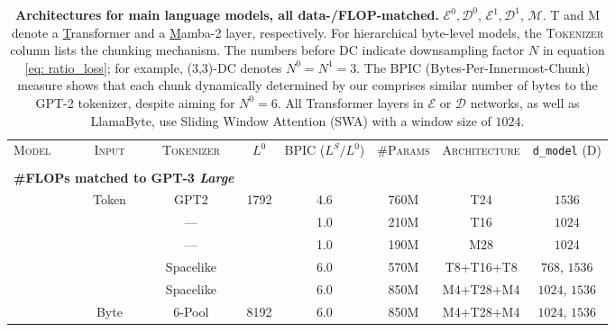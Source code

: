 \begin{table}[t!]
\caption{
\textbf{Architectures for main language models, all data-/FLOP-matched.} \colorbox{EncDec0}{$\mathcal{E}^0,\mathcal{D}^0$}, \colorbox{EncDec1}{$\mathcal{E}^1,\mathcal{D}^1$}, \colorbox{Main}{$\mathcal{M}$}.
T and M denote a \underline{T}ransformer and a \underline{M}amba-2 layer, respectively.
For hierarchical byte-level models, the \textsc{Tokenizer} column lists the chunking mechanism.
The numbers before DC indicate downsampling factor $N$ in equation \eqref{eq: ratio_loss}; for example, (3,3)-DC denotes $N^0=N^1=3$.
The BPIC (Bytes-Per-Innermost-Chunk) measure shows that each chunk dynamically determined by our \onestage{} comprises similar number of bytes to the GPT-2 tokenizer, despite aiming for $N^0=6$.
All Transformer layers in $\mathcal{E}$ or $\mathcal{D}$ networks, as well as LlamaByte, use Sliding Window Attention (SWA) with a window size of $1024$.
}
\centering
\small
\resizebox{\linewidth}{!}
{ 
\begin{tabular}{lccccccc} 
\toprule
\multirow{2}{*}{\textsc{Model}} & \multirow{2}{*}{\textsc{Input}} & \multirow{2}{*}{\textsc{Tokenizer}} & \multirow{2}{*}{$L^0$} & \multirowcell{2}{\textsc{BPIC}\\($L^S / L^0$)} & \multirow{2}{*}{\textsc{\#Params}} & \multirow{2}{*}{\textsc{Architecture}} & \multirow{2}{*}{\texttt{d\_model} (D)}\\
\\
\midrule
\multicolumn{3}{l}{\quad \textbf{\#FLOPs matched to GPT-3 \textit{Large}}}\\
\cellcolor{Gray7!20}{Transformer} & {Token} & {GPT2} & {1792} & 4.6 & 760M & \colorbox{Main}{T24} & \colorbox{Main}{$1536$}\\
\addlinespace[-0.15em]
\cmidrule{1-8}
\addlinespace[-0.25em]
\cellcolor{Grape7!10}{LlamaByte} & & --- & & 1.0 & 210M & \colorbox{Main}{T16} & \colorbox{Main}{$1024$}\\
\cellcolor{Blue7!10}{MambaByte} & & --- & & 1.0 & 190M & \colorbox{Main}{M28} & \colorbox{Main}{$1024$}\\
\cellcolor{Cyan7!10}{SpaceByte} & & Spacelike & & 6.0 & 570M & \colorbox{EncDec0}{T8}+\colorbox{Main}{T16}+\colorbox{EncDec0}{T8} & \colorbox{EncDec0}{$768$}, \colorbox{Main}{$1536$}\\
\cellcolor{Cyan7!10}{SpaceByte++} & & Spacelike & & 6.0 & 850M & \colorbox{EncDec0}{M4}+\colorbox{Main}{T28}+\colorbox{EncDec0}{M4} & \colorbox{EncDec0}{$1024$}, \colorbox{Main}{$1536$}\\
\cellcolor{Green7!10}{H-Net (pool)} & \multirow{-2}{*}{Byte} & 6-Pool & \multirow{-2}{*}{8192} & 6.0 & 850M & \colorbox{EncDec0}{M4}+\colorbox{Main}{T28}+\colorbox{EncDec0}{M4} & \colorbox{EncDec0}{$1024$}, \colorbox{Main}{$1536$}\\

\end{tabular}}
\end{table}
